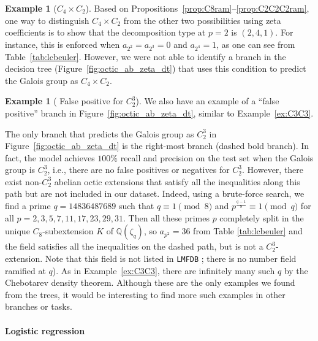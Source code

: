 \documentclass[letterpaper, 10pt]{article}
\newcommand{\bQ}{\mathbb{Q}}
\newcommand{\1}{\mathds{1}}	%
\theoremstyle{definition}
\newtheorem{example}[theorem]{Example}
\theoremstyle{remark}
\begin{document}
\begin{example}[$C_4 \times C_2$]
    Based on Propositions~\ref{prop:C8ram}--\ref{prop:C2C2C2ram}, one way to distinguish \( C_4 \times C_2 \) from the other two possibilities using zeta coefficients is to show that the decomposition type at \( p = 2 \) is \( (2, 4, 1) \).  
For instance, this is enforced when \( a_{2^2} = a_{2^3} = 0 \) and \( a_{2^4} = 1 \), as one can see from Table~\ref{tab:lcbeuler}.  
However, we were not able to identify a branch in the decision tree (Figure~\ref{fig:octic_ab_zeta_dt}) that uses this condition to predict the Galois group as \( C_4 \times C_2 \).
\end{example}


\begin{example}[ False positive for $C_2^3$]
\label{ex:C2C2C2}
 We also have an example of a ``false positive'' branch in Figure~\ref{fig:octic_ab_zeta_dt}, similar to Example~\ref{ex:C3C3}.

The only branch that predicts the Galois group as \( C_2^3 \) in Figure~\ref{fig:octic_ab_zeta_dt} is the right-most branch (dashed bold branch).   In fact, the model achieves \(100\%\) recall and precision on the test set when the Galois group is \( C_2^3 \), i.e., there are no false positives or negatives for $C_2^3$.  
However, there exist non-\( C_2^3 \) abelian octic extensions that satisfy all the inequalities along this path but are not included in our dataset. Indeed, using a brute-force search, we find a prime \( q = \num{14836487689} \) such that \( q \equiv 1 \pmod{8} \) and \( p^{\frac{q-1}{8}} \equiv 1 \pmod{q} \) for all \( p = 2, 3, 5, 7, 11, 17, 23, 29, 31 \).  
Then all these primes \( p \) completely split in the unique \( C_8 \)-subextension \( K \) of \( \bQ(\zeta_q) \), so \( a_{p^2} = 36 \) from Table \ref{tab:lcbeuler} and the field satisfies all the inequalities on the dashed path, but is not a \( C_2^3 \)-extension.  
Note that this field is not listed in \texttt{LMFDB} \cite{lmfdb}; there is no number field ramified at \( q \)).
As in Example~\ref{ex:C3C3}, there are infinitely many such \( q \) by the Chebotarev density theorem.
 Although these are the only examples we found from the trees, it would be interesting to find more such examples in other branches or tasks.
\end{example}


\paragraph{Logistic regression}
\end{document}
